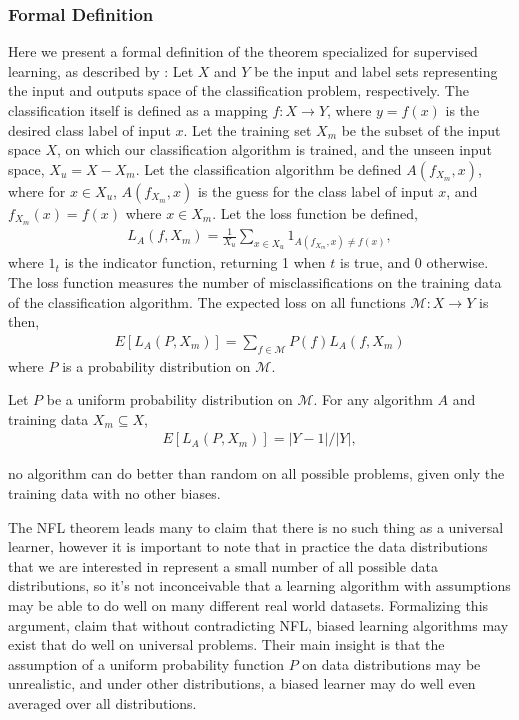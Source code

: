 \documentclass[thesis]{subfiles}
\begin{document}
\subsubsection{Formal Definition}
Here we present a formal definition of the theorem specialized for supervised learning, as described by \citet{lattimore2013no}: Let $X$ and $Y$ be the input and label sets representing the input and outputs space of the classification problem, respectively. The classification itself is defined as a mapping $f: X \to Y$, where $y=f(x)$ is the desired class label of input $x$. Let the training set $X_m$ be the subset of the input space $X$, on which our classification algorithm is trained, and the unseen input space, $X_u = X - X_m$. Let the classification algorithm be defined $A(f_{X_{m}}, x)$, where for $x \in X_u$, $A(f_{X_{m}}, x)$ is the guess for the class label of input $x$, and $f_{X_{m}}(x) = f(x)$ where $x\in X_m$. Let the loss function be defined,
%
\begin{align}
    L_A(f, X_m) = \frac{1}{X_u} \sum_{x\in X_u} 1_{A(f_{X_m}, x) \neq f(x)},
\end{align}
%
where $1_{t}$ is the indicator function, returning 1 when $t$ is true, and 0 otherwise. The loss function measures the number of misclassifications on the training data of the classification algorithm. The expected loss on all functions $\mathcal{M}: X \to Y$ is then,
%
\begin{align}
    E\left[ L_A\left(P, X_m\right) \right] = \sum_{f\in \mathcal{M}} P(f)L_A(f, X_m)
\end{align} 
%
where $P$ is a probability distribution on $\mathcal{M}$.

\begin{theorem}\label{NFL}
Let $P$ be a uniform probability distribution on $\mathcal{M}$. For any algorithm $A$ and training data $X_m\subseteq X$,
\begin{align}
    E\left[ L_A\left(P, X_m\right) \right] = | Y - 1 |/|Y|,
\end{align}
\end{theorem}
%
\ie no algorithm can do better than random on all possible problems, given only the training data with no other biases.

The NFL theorem leads many to claim that there is no such thing as a universal learner, however it is important to note that in practice the data distributions that we are interested in represent a small number of all possible data distributions, so it's not inconceivable that a learning algorithm with assumptions may be able to do well on many different real world datasets. Formalizing this argument, \citet{lattimore2013no} claim that without contradicting NFL, biased learning algorithms may exist that do well on universal problems. Their main insight is that the assumption of a uniform probability function $P$ on data distributions may be unrealistic, and under other distributions, a biased learner may do well even averaged over all distributions.
\end{document}
